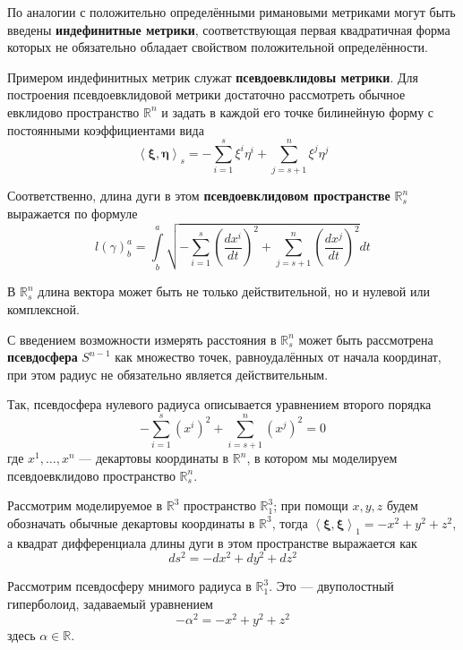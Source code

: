 \documentclass{article}
\numberwithin{equation}{section}
\newcommand{\neword}[1]{\textbf{#1}}
\newcommand{\scalmult}[2]{{\left \langle #1 \right \rangle}_{#2}}
\renewcommand{\vec}{\mathbf}
\begin{document}
По аналогии с положительно определёнными римановыми метриками могут
быть введены \neword{индефинитные метрики}, соответствующая первая
квадратичная форма которых не обязательно обладает свойством
положительной определённости.

Примером индефинитных метрик служат \neword{псевдоевклидовы метрики}.
Для построения псевдоевклидовой метрики достаточно рассмотреть обычное
евклидово пространство $\mathbb{R}^n$ и задать в каждой его точке
билинейную форму с постоянными коэффициентами вида
\begin{equation*}
  \scalmult{\vec{\xi}, \vec{\eta}}{s} = -\sum_{i=1}^s {\xi^i \eta^i} +
\sum_{j=s+1}^n {\xi^j \eta^j}
\end{equation*}

Соответственно, длина дуги в этом \neword{псевдоевклидовом
  пространстве} $\mathbb{R}^n_s$ выражается по формуле
\begin{equation*}
  l(\gamma)^a_b = \int \limits^a_b {\sqrt{-\sum_{i=1}^s
      {\left (\frac{dx^i}{dt} \right )}^2 + \sum_{j=s+1}^n
      {\left (\frac{dx^j}{dt} \right )}^2}dt}
\end{equation*}

В $\mathbb{R}^n_s$ длина вектора может быть не только действительной,
но и нулевой или комплексной.

С введением возможности измерять расстояния в $\mathbb{R}^n_s$ может
быть рассмотрена \neword{псевдосфера} $S^{n-1}$ как множество точек,
равноудалённых от начала координат, при этом радиус не обязательно
является действительным.

Так, псевдосфера нулевого радиуса описывается уравнением второго порядка
\begin{equation*}
  -\sum_{i=1}^s\left (x^i \right)^2 + \sum_{i=s+1}^n\left(x^j \right)^2 = 0  
\end{equation*}
где $x^1, \dotsc, x^n $ — декартовы координаты в $\mathbb{R}^n$, в
котором мы моделируем псевдоевклидово пространство $\mathbb{R}^n_s$.

Рассмотрим моделируемое в $\mathbb{R}^3$ пространство
$\mathbb{R}^3_1$; при помощи $x, y, z$ будем обозначать обычные
декартовы координаты в $\mathbb{R}^3$, тогда
\mbox{$\scalmult{\vec{\xi}, \vec{\xi}}{1} = -x^2 + y^2 + z^2$}, а
квадрат дифференциала длины дуги в этом пространстве выражается как
\begin{equation}\label{eq:R^3_1-linear-element}
  ds^2 = -dx^2 + dy^2 + dz^2
\end{equation}

Рассмотрим псевдосферу мнимого радиуса в $\mathbb{R}^3_1$. Это —
двуполостный гиперболоид, задаваемый уравнением
\begin{equation}\label{eq:pseudosphere}
  -\alpha^2 = -x^2 +y^2 + z^2
\end{equation}
здесь $\alpha \in \mathbb{R}$.
\end{document}
